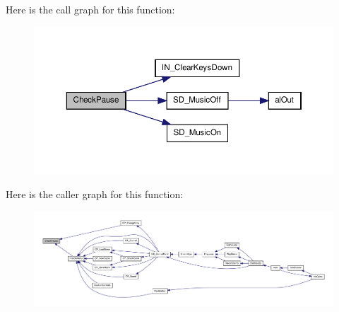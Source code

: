 Here is the call graph for this function:
\nopagebreak
\begin{figure}[H]
\begin{center}
\leavevmode
\includegraphics[width=370pt]{WL__MENU_8H_a091147f2346aaad8a89508a27b711c3f_cgraph}
\end{center}
\end{figure}




Here is the caller graph for this function:
\nopagebreak
\begin{figure}[H]
\begin{center}
\leavevmode
\includegraphics[width=400pt]{WL__MENU_8H_a091147f2346aaad8a89508a27b711c3f_icgraph}
\end{center}
\end{figure}


